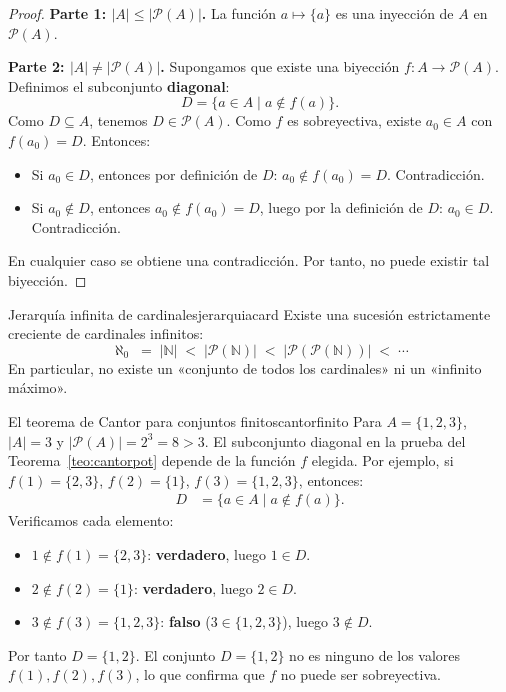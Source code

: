 \begin{proof}
\textbf{Parte 1: $|A| \leq |\mathcal{P}(A)|$.} La función $a \mapsto \{a\}$ es una inyección de $A$ en $\mathcal{P}(A)$.

\textbf{Parte 2: $|A| \neq |\mathcal{P}(A)|$.} Supongamos que existe una biyección $f: A \to \mathcal{P}(A)$. Definimos el subconjunto \textbf{diagonal}:
\[
  D = \{a \in A \mid a \notin f(a)\}.
\]
Como $D \subseteq A$, tenemos $D \in \mathcal{P}(A)$. Como $f$ es sobreyectiva, existe $a_0 \in A$ con $f(a_0) = D$. Entonces:
\begin{itemize}[leftmargin=2em]
  \item Si $a_0 \in D$, entonces por definición de $D$: $a_0 \notin f(a_0) = D$. Contradicción.
  \item Si $a_0 \notin D$, entonces $a_0 \notin f(a_0) = D$, luego por la definición de $D$: $a_0 \in D$. Contradicción.
\end{itemize}
En cualquier caso se obtiene una contradicción. Por tanto, no puede existir tal biyección.
\end{proof}

\begin{corolario}{Jerarquía infinita de cardinales}{jerarquiacard}
Existe una sucesión estrictamente creciente de cardinales infinitos:
\[
  \aleph_0 \;=\; |\mathbb{N}| \;<\; |\mathcal{P}(\mathbb{N})| \;<\; |\mathcal{P}(\mathcal{P}(\mathbb{N}))| \;<\; \cdots
\]
En particular, no existe un «conjunto de todos los cardinales» ni un «infinito máximo».
\end{corolario}

\begin{ejemplo}{El teorema de Cantor para conjuntos finitos}{cantorfinito}
Para $A = \{1, 2, 3\}$, $|A| = 3$ y $|\mathcal{P}(A)| = 2^3 = 8 > 3$. El subconjunto diagonal en la prueba del Teorema~\ref{teo:cantorpot} depende de la función $f$ elegida. Por ejemplo, si $f(1) = \{2, 3\}$, $f(2) = \{1\}$, $f(3) = \{1, 2, 3\}$, entonces:
\begin{align*}
  D &= \{a \in A \mid a \notin f(a)\}.
\end{align*}
Verificamos cada elemento:
\begin{itemize}[leftmargin=2em]
  \item $1 \notin f(1) = \{2,3\}$: \textbf{verdadero}, luego $1 \in D$.
  \item $2 \notin f(2) = \{1\}$: \textbf{verdadero}, luego $2 \in D$.
  \item $3 \notin f(3) = \{1,2,3\}$: \textbf{falso} ($3 \in \{1,2,3\}$), luego $3 \notin D$.
\end{itemize}
Por tanto $D = \{1, 2\}$. El conjunto $D = \{1, 2\}$ no es ninguno de los valores $f(1), f(2), f(3)$, lo que confirma que $f$ no puede ser sobreyectiva.
\end{ejemplo}

